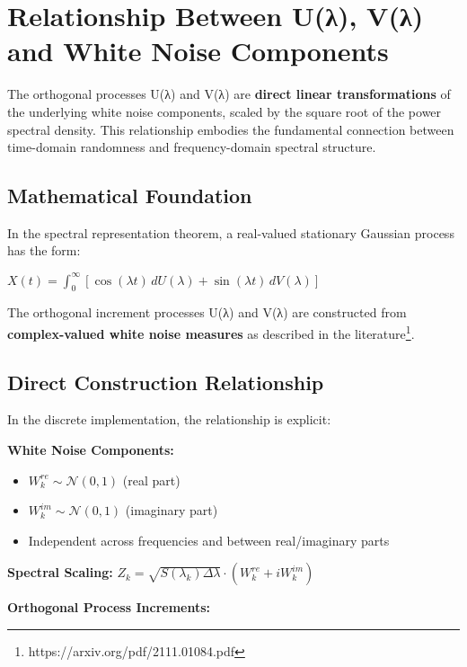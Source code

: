 \documentclass[
]{article}
\author{}
\date{}
\providecommand{\tightlist}{%
  \setlength{\itemsep}{0pt}\setlength{\parskip}{0pt}}
\begin{document}
\section{Relationship Between U(λ), V(λ) and White Noise
Components}\label{relationship-between-uux3bb-vux3bb-and-white-noise-components}

The orthogonal processes U(λ) and V(λ) are \textbf{direct linear
transformations} of the underlying white noise components, scaled by the
square root of the power spectral density. This relationship embodies
the fundamental connection between time-domain randomness and
frequency-domain spectral structure.

\subsection{Mathematical Foundation}\label{mathematical-foundation}

In the spectral representation theorem, a real-valued stationary
Gaussian process has the form:

\(X(t) = \int_0^{\infty} [\cos(\lambda t) \, dU(\lambda) + \sin(\lambda t) \, dV(\lambda)]\)

The orthogonal increment processes U(λ) and V(λ) are constructed from
\textbf{complex-valued white noise measures} as described in the
literature\footnote{https://arxiv.org/pdf/2111.01084.pdf}.

\subsection{Direct Construction
Relationship}\label{direct-construction-relationship}

In the discrete implementation, the relationship is explicit:

\textbf{White Noise Components:}

\begin{itemize}
\tightlist
\item
  \(W_k^{re} \sim \mathcal{N}(0,1)\) (real part)
\item
  \(W_k^{im} \sim \mathcal{N}(0,1)\) (imaginary part)
\item
  Independent across frequencies and between real/imaginary parts
\end{itemize}

\textbf{Spectral Scaling:}
\(Z_k = \sqrt{S(\lambda_k) \Delta\lambda} \cdot (W_k^{re} + i W_k^{im})\)

\textbf{Orthogonal Process Increments:}
\end{document}

